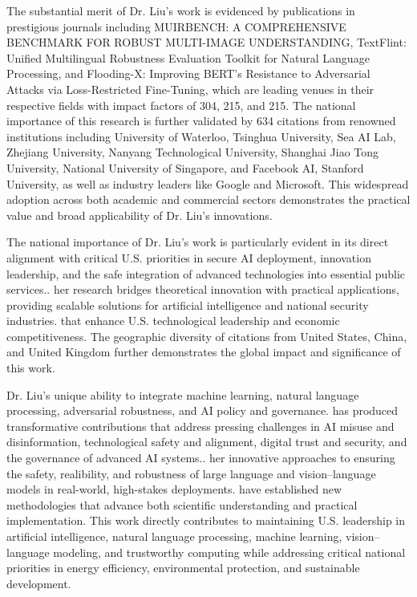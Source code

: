 \documentclass{article}
\begin{document}
The substantial merit of Dr. Liu's work is evidenced by publications in prestigious journals including MUIRBENCH: A COMPREHENSIVE BENCHMARK FOR ROBUST MULTI-IMAGE UNDERSTANDING, TextFlint: Unified Multilingual Robustness Evaluation Toolkit for Natural Language Processing, and Flooding-X: Improving BERT’s Resistance to Adversarial Attacks via Loss-Restricted Fine-Tuning, which are leading venues in their respective fields with impact factors of 304, 215, and 215. The national importance of this research is further validated by 634 citations from renowned institutions including University of Waterloo, Tsinghua University, Sea AI Lab, Zhejiang University, Nanyang Technological University, Shanghai Jiao Tong University, National University of Singapore, and Facebook AI, Stanford University, as well as industry leaders like Google and Microsoft. This widespread adoption across both academic and commercial sectors demonstrates the practical value and broad applicability of Dr. Liu's innovations.

The national importance of Dr. Liu's work is particularly evident in its direct alignment with critical U.S. priorities in secure AI deployment, innovation leadership, and the safe integration of advanced technologies into essential public services.. her research bridges theoretical innovation with practical applications, providing scalable solutions for artificial intelligence and national security industries. that enhance U.S. technological leadership and economic competitiveness. The geographic diversity of citations from United States, China, and United Kingdom further demonstrates the global impact and significance of this work.

Dr. Liu's unique ability to integrate machine learning, natural language processing, adversarial robustness, and AI policy and governance. has produced transformative contributions that address pressing challenges in AI misuse and disinformation, technological safety and alignment, digital trust and security, and the governance of advanced AI systems.. her innovative approaches to ensuring the safety, realibility, and robustness of large language and vision–language models in real-world, high-stakes deployments. have established new methodologies that advance both scientific understanding and practical implementation. This work directly contributes to maintaining U.S. leadership in artificial intelligence, natural language processing, machine learning, vision–language modeling, and trustworthy computing while addressing critical national priorities in energy efficiency, environmental protection, and sustainable development.
\end{document}
